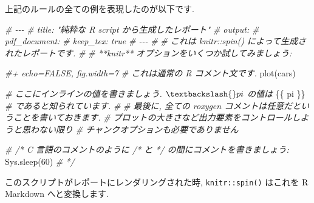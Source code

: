 \documentclass[
  11pt,
  lualatex,
  ja=standard]{bxjsreport}
\newenvironment{Shaded}{\begin{snugshade}}{\end{snugshade}}
\newcommand{\CommentTok}[1]{\textcolor[rgb]{0.56,0.35,0.01}{\textit{#1}}}
\newcommand{\DecValTok}[1]{\textcolor[rgb]{0.00,0.00,0.81}{#1}}
\newcommand{\FunctionTok}[1]{\textcolor[rgb]{0.00,0.00,0.00}{#1}}
\newcommand{\NormalTok}[1]{#1}
\begin{document}
上記のルールの全ての例を表現したのが以下です.

\begin{Shaded}
\begin{Highlighting}[]
\CommentTok{\#\textquotesingle{} {-}{-}{-}}
\CommentTok{\#\textquotesingle{} title: "純粋な R script から生成したレポート"}
\CommentTok{\#\textquotesingle{} output:}
\CommentTok{\#\textquotesingle{}   pdf\_document:}
\CommentTok{\#\textquotesingle{}     keep\_tex: true}
\CommentTok{\#\textquotesingle{} {-}{-}{-}}
\CommentTok{\#\textquotesingle{}}
\CommentTok{\#\textquotesingle{} これは \textasciigrave{}knitr::spin()\textasciigrave{} によって生成されたレポートです.}
\CommentTok{\#\textquotesingle{}}
\CommentTok{\#\textquotesingle{} **knitr** オプションをいくつか試してみましょう:}

\CommentTok{\#+ echo=FALSE, fig.width=7}
\CommentTok{\#  これは通常の R コメント文です.}
\FunctionTok{plot}\NormalTok{(cars)}

\CommentTok{\#\textquotesingle{} ここにインラインの値を書きましょう. $\textbackslash{}pi$ の値は}
\NormalTok{\{\{ pi \}\}}
\CommentTok{\#\textquotesingle{} であると知られています.}
\CommentTok{\#\textquotesingle{}}
\CommentTok{\#\textquotesingle{} 最後に, 全ての roxygen コメントは任意だということを書いておきます.}
\CommentTok{\#\textquotesingle{} プロットの大きさなど出力要素をコントロールしようと思わない限り}
\CommentTok{\#\textquotesingle{} チャンクオプションも必要でありません}

\CommentTok{\# /* C 言語のコメントのように /* と */ の間にコメントを書きましょう:}
\FunctionTok{Sys.sleep}\NormalTok{(}\DecValTok{60}\NormalTok{)}
\CommentTok{\# */}
\end{Highlighting}
\end{Shaded}

このスクリプトがレポートにレンダリングされた時, \texttt{knitr::spin()} はこれを R Markdown へと変換します.
\end{document}
